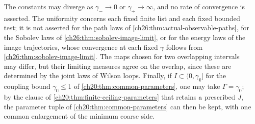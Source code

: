 \begin{remark}\label{ch26:rem:compact-coupling-scope}
The constants may diverge as $\gamma_-\to0$ or $\gamma_+\to\infty$, and no rate of convergence is asserted. The uniformity concerns each fixed finite list and each fixed bounded test; it is not asserted for the path laws of \cref{ch26:thm:actual-observable-paths}, for the Sobolev laws of \cref{ch26:thm:sobolev-image-limit}, or for the energy laws of the image trajectories, whose convergence at each fixed $\gamma$ follows from \cref{ch26:thm:sobolev-image-limit}. The maps chosen for two overlapping intervals may differ, but their limiting measures agree on the overlap, since these are determined by the joint laws of Wilson loops. Finally, if $I\subset(0,\gamma_0]$ for the coupling bound $\gamma_0\le1$ of \cref{ch20:thm:common-parameters}, one may take $\Gamma=\gamma_0$; by the clause of \cref{ch20:thm:finite-ceiling-parameters} that retains a prescribed $J$, the parameter tuple of \cref{ch20:thm:common-parameters} can then be kept, with one common enlargement of the minimum coarse side.
\end{remark}

